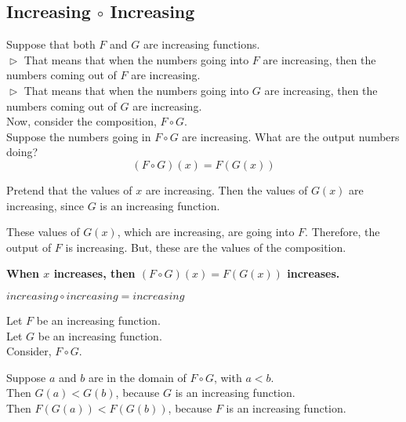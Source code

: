 \documentclass{ximera}
\begin{document}
\subsection*{Increasing $\circ$ Increasing}


Suppose that both $F$ and $G$ are increasing functions. \\

$\vartriangleright$ That means that when the numbers going into $F$ are increasing, then the numbers coming out of $F$ are increasing. \\

$\vartriangleright$ That means that when the numbers going into $G$ are increasing, then the numbers coming out of $G$ are increasing. \\



Now, consider the composition, $F \circ G$. \\


Suppose the numbers going in $F \circ G$ are increasing.  What are the output numbers doing? \\




\[ (F \circ G)(x) = F(G(x)) \]


Pretend that the values of $x$ are increasing. Then the values of $G(x)$ are increasing, since $G$ is an increasing function.

These values of $G(x)$, which are increasing, are going into $F$.  Therefore, the output of $F$ is increasing.  But, these are the values of the composition.



\begin{center}
\textbf{\textcolor{red!70!black}{When $x$ increases, then $(F \circ G)(x) = F(G(x))$ increases.}}
\end{center}






\begin{fact}
$increasing \circ increasing = increasing$


Let $F$ be an increasing function. \\
Let $G$ be an increasing function. \\


Consider, $F \circ G$.

Suppose $a$ and $b$ are in the domain of $F \circ G$, with $a < b$. \\

Then $G(a) < G(b)$, because $G$ is an increasing function. \\

Then $F(G(a)) < F(G(b))$, because $F$ is an increasing function.


\end{fact}
\end{document}
